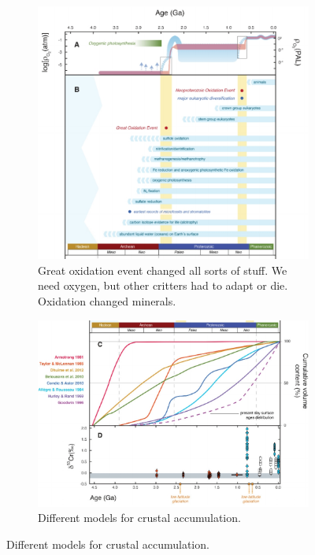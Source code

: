 \documentclass[]{article}
\begin{document}
\begin{figure}[H]
	\caption{Geologic Record is inseparable from history of life}\label{fig:GeologicRecord} 
	
	\begin{subfigure}[b]{0.45\textwidth}
		\centering
		\caption{Great oxidation event changed all sorts of stuff. We need oxygen, but other critters had to adapt or die. Oxidation changed minerals.}
		\includegraphics[width=\textwidth]{GeologicRecord}
	\end{subfigure}
	\begin{subfigure}[b]{0.45\textwidth}
		\centering
		\caption{Different models for crustal accumulation.}
		\includegraphics[width=\textwidth]{GeologicRecord1}
	\end{subfigure}
\end{figure}
\end{document}
